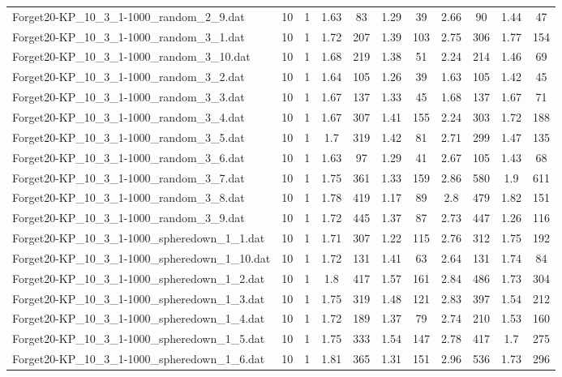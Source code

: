 \begin{table}[!ht]
\begin{tabular}{lcccccccccc}
Forget20-KP\_10\_3\_1-1000\_random\_2\_9.dat & 10 & 1 & 1.63 & 83 & 1.29 & 39 & 2.66 & 90 & 1.44 & 47 \\
Forget20-KP\_10\_3\_1-1000\_random\_3\_1.dat & 10 & 1 & 1.72 & 207 & 1.39 & 103 & 2.75 & 306 & 1.77 & 154 \\
Forget20-KP\_10\_3\_1-1000\_random\_3\_10.dat & 10 & 1 & 1.68 & 219 & 1.38 & 51 & 2.24 & 214 & 1.46 & 69 \\
Forget20-KP\_10\_3\_1-1000\_random\_3\_2.dat & 10 & 1 & 1.64 & 105 & 1.26 & 39 & 1.63 & 105 & 1.42 & 45 \\
Forget20-KP\_10\_3\_1-1000\_random\_3\_3.dat & 10 & 1 & 1.67 & 137 & 1.33 & 45 & 1.68 & 137 & 1.67 & 71 \\
Forget20-KP\_10\_3\_1-1000\_random\_3\_4.dat & 10 & 1 & 1.67 & 307 & 1.41 & 155 & 2.24 & 303 & 1.72 & 188 \\
Forget20-KP\_10\_3\_1-1000\_random\_3\_5.dat & 10 & 1 & 1.7 & 319 & 1.42 & 81 & 2.71 & 299 & 1.47 & 135 \\
Forget20-KP\_10\_3\_1-1000\_random\_3\_6.dat & 10 & 1 & 1.63 & 97 & 1.29 & 41 & 2.67 & 105 & 1.43 & 68 \\
Forget20-KP\_10\_3\_1-1000\_random\_3\_7.dat & 10 & 1 & 1.75 & 361 & 1.33 & 159 & 2.86 & 580 & 1.9 & 611 \\
Forget20-KP\_10\_3\_1-1000\_random\_3\_8.dat & 10 & 1 & 1.78 & 419 & 1.17 & 89 & 2.8 & 479 & 1.82 & 151 \\
Forget20-KP\_10\_3\_1-1000\_random\_3\_9.dat & 10 & 1 & 1.72 & 445 & 1.37 & 87 & 2.73 & 447 & 1.26 & 116 \\
Forget20-KP\_10\_3\_1-1000\_spheredown\_1\_1.dat & 10 & 1 & 1.71 & 307 & 1.22 & 115 & 2.76 & 312 & 1.75 & 192 \\
Forget20-KP\_10\_3\_1-1000\_spheredown\_1\_10.dat & 10 & 1 & 1.72 & 131 & 1.41 & 63 & 2.64 & 131 & 1.74 & 84 \\
Forget20-KP\_10\_3\_1-1000\_spheredown\_1\_2.dat & 10 & 1 & 1.8 & 417 & 1.57 & 161 & 2.84 & 486 & 1.73 & 304 \\
Forget20-KP\_10\_3\_1-1000\_spheredown\_1\_3.dat & 10 & 1 & 1.75 & 319 & 1.48 & 121 & 2.83 & 397 & 1.54 & 212 \\
Forget20-KP\_10\_3\_1-1000\_spheredown\_1\_4.dat & 10 & 1 & 1.72 & 189 & 1.37 & 79 & 2.74 & 210 & 1.53 & 160 \\
Forget20-KP\_10\_3\_1-1000\_spheredown\_1\_5.dat & 10 & 1 & 1.75 & 333 & 1.54 & 147 & 2.78 & 417 & 1.7 & 275 \\
Forget20-KP\_10\_3\_1-1000\_spheredown\_1\_6.dat & 10 & 1 & 1.81 & 365 & 1.31 & 151 & 2.96 & 536 & 1.73 & 296 \\

\end{tabular}
\end{table}

